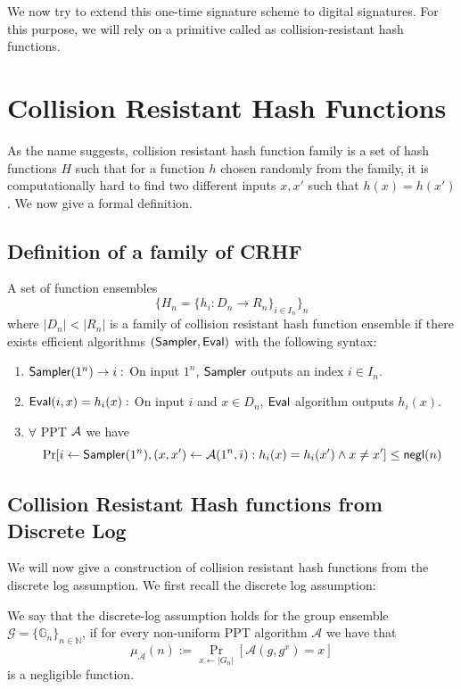 \documentclass[12pt]{tufte-book}
\begin{document}
We now try to extend this one-time signature scheme to digital signatures. For this purpose, we will rely on a primitive called as collision-resistant hash functions.

\section{Collision Resistant Hash Functions}

As the name suggests, collision resistant hash function family is a set of hash functions $H$ such that for a function $h$ chosen randomly from the family, it is computationally hard to find two different inputs $x,x'$ such that $h(x) = h(x')$. We now give a formal definition.

\subsection{Definition of a family of CRHF}

A set of function ensembles
\[ \{H_n = \{h_i : D_n \to R_n \}_{i \in I_n} \}_n\]
where $|D_n| < |R_n|$ is a family of collision resistant hash function ensemble if there exists efficient algorithms $(\mathsf{Sampler},\mathsf{Eval})$ with the following syntax:
\begin{enumerate}
\item $\mathsf{Sampler}(1^n) \to i:$ On input $1^n$, $\mathsf{Sampler}$ outputs an index $i \in I_n$.
\item $\mathsf{Eval}(i,x) = h_i(x):$ On input $i$ and $x \in D_n$, $\mathsf{Eval}$ algorithm outputs $h_i(x)$. 
\item $\forall$ PPT $\mathcal{A}$ we have
\[\Pr[i \gets \mathsf{Sampler}(1^n), (x,x') \gets \mathcal{A}(1^n,i) : h_i(x) = h_i(x') \wedge x \neq x'] \leq \mathsf{negl}(n)\]
\end{enumerate}


\subsection{Collision Resistant Hash functions from Discrete Log}
We will now give a construction of collision resistant hash functions from the discrete log assumption. We first recall the discrete log assumption:
\begin{definition}
We say that the discrete-log assumption holds for the group ensemble $\mathcal{G} =\{ \mathbb{G}_n\}_{n \in \mathbb{N}}$, if for every non-uniform PPT algorithm $\mathcal{A}$ we have that
\[\mu_\mathcal{A}(n) := \Pr_{x \leftarrow |G_n|}[\mathcal{A}(g,g^x) = x]\]
is a negligible function.
\end{definition}
\end{document}
